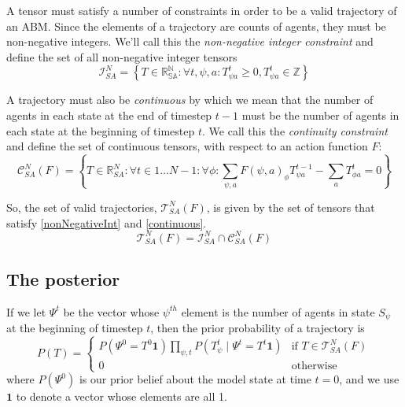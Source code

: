 \documentclass{article}
\begin{document}
A tensor must satisfy a number of constraints in order to be a valid trajectory of an ABM. Since the elements of a trajectory are counts of agents, they must be non-negative integers. We'll call this the \textit{non-negative integer constraint} and define the set of all non-negative integer tensors
\begin{equation}
\mathcal{I}^N_{SA} = \left\{ T \in \mathbb{R^N_{SA}}: \forall t,\psi, a: T^t_{\psi a} \ge 0, T^t_{\psi a} \in \mathbb{Z}\right\}
\label{nonNegativeInt}
\end{equation}

A trajectory must also be \textit{continuous} by which we mean that the number of agents in each state at the end of timestep $t-1$ must be the number of agents in each state at the beginning of timestep $t$. We call this the \textit{continuity constraint} and define the set of continuous tensors, with respect to an action function $F$:
\begin{equation}
\mathcal{C}^N_{SA}(F) = \left\{T\in\mathbb{R}^N_{SA}:  \forall t \in 1 ... N-1:\forall \phi: \sum_{\psi, a} F(\psi, a)_\phi T^{t-1}_{\psi a} - \sum_a T^t_{\phi a} = 0\right\}
\label{continuous}
\end{equation}

So, the set of valid trajectories, $\mathcal{T}^N_{SA}(F)$, is given by the set of tensors that satisfy \eqref{nonNegativeInt} and \eqref{continuous}.
\begin{equation}
\mathcal{T}^N_{SA}(F) = \mathcal{I}^N_{SA} \cap \mathcal{C}^N_{SA}(F)
\label{SetOfTrajectories}
\end{equation}


\subsection{The posterior}

If we let $\Psi^t$ be the vector whose $\psi^{th}$ element is the number of agents in state $S_\psi$ at the beginning of timestep $t$, then the prior probability of a trajectory is
\[
P(T) =
\begin{cases}
P\left(\Psi^0 = T^0 \mathbf{1} \right) \prod_{\psi, t} P\left(T^t_{\psi} \mid \Psi^t = T^t \mathbf{1}\right) & \text{if } T \in \mathcal{T}^N_{SA}(F) \\
0 & \text{otherwise}
\end{cases}
\]
where $P(\Psi^0)$ is our prior belief about the model state at time $t=0$, and we use $\mathbf{1}$ to denote a vector whose elements are all 1.
\end{document}
